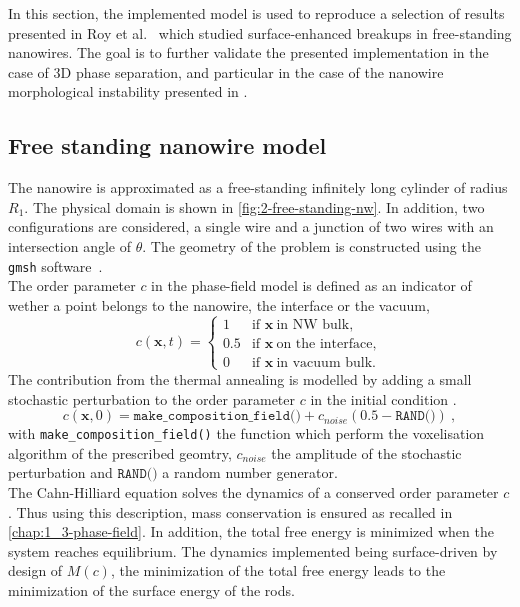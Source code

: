 \label{chap:2_4-nanowire}
In this section, the implemented model is used to reproduce a selection of results presented in Roy et al.\ \cite{RoyVarmaGururajan2021} which studied surface-enhanced breakups in free-standing nanowires. The goal is to further validate the presented implementation in the case of 3D phase separation, and particular in the case of the nanowire morphological instability presented in \cite{RoyVarmaGururajan2021}.
\subsection{Free standing nanowire model}
    The nanowire is approximated as a free-standing infinitely long cylinder of radius $R_1$. The physical domain is shown in \autoref{fig:2-free-standing-nw}. In addition, two configurations are considered, a single wire and a junction of two wires with an intersection angle of $\theta$. The geometry of the problem is constructed using the \texttt{gmsh} software\ \cite{GeuzaineRemacle}.\\
    The order parameter $c$ in the phase-field model is defined as an indicator of wether a point belongs to the nanowire, the interface or the vacuum,
    \begin{equation}
        c(\mathbf{x}, t) = \begin{cases}
            1 & \text{if } \mathbf{x}\ \text{in NW bulk}, \\
            0.5 & \text{if } \mathbf{x}\ \text{on the interface}, \\
            0 & \text{if } \mathbf{x}\ \text{in vacuum bulk}.
        \end{cases}
    \end{equation}
    The contribution from the thermal annealing is modelled by adding a small stochastic perturbation to the order parameter $c$ in the initial condition \cite{BallFinkBowler2003}.
    \begin{equation}
        c(\mathbf{x}, 0) = \texttt{make\_composition\_field()} + c_{noise}(0.5-\texttt{RAND()})\ ,
    \end{equation}
    with \texttt{make\_composition\_field()} the function which perform the voxelisation algorithm of the prescribed geomtry, $c_{noise}$ the amplitude of the stochastic perturbation and $\texttt{RAND()}$ a random number generator.\\
    The Cahn-Hilliard equation solves the dynamics of a conserved order parameter $c$. Thus using this description, mass conservation is ensured as recalled in \autoref{chap:1_3-phase-field}. In addition, the total free energy is minimized when the system reaches equilibrium. The dynamics implemented being surface-driven by design of $M(c)$, the minimization of the total free energy leads to the minimization of the surface energy of the rods.\\
